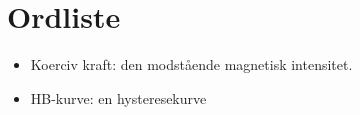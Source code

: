 \section{Ordliste}
\begin{itemize}
\item Koerciv kraft: den modstående magnetisk intensitet.
\item HB-kurve: en hysteresekurve
\end{itemize}
